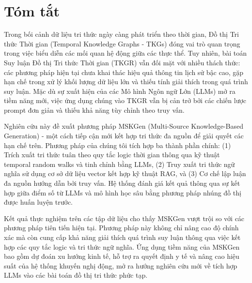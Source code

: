\chapter*{Tóm tắt}
\label{summary}

Trong bối cảnh dữ liệu tri thức ngày càng phát triển theo thời gian, Đồ thị Tri thức Thời gian (Temporal Knowledge Graphs - TKGs) đóng vai trò quan trọng trong việc biểu diễn các mối quan hệ động giữa các thực thể. Tuy nhiên, bài toán Suy luận Đồ thị Tri thức Thời gian (TKGR) vẫn đối mặt với nhiều thách thức: các phương pháp hiện tại chưa khai thác hiệu quả thông tin lịch sử bậc cao, gặp hạn chế trong xử lý khối lượng dữ liệu lớn và thiếu tính giải thích trong quá trình suy luận. Mặc dù sự xuất hiện của các Mô hình Ngôn ngữ Lớn (LLMs) mở ra tiềm năng mới, việc ứng dụng chúng vào TKGR vẫn bị cản trở bởi các chiến lược prompt đơn giản và thiếu khả năng tùy chỉnh theo truy vấn.

Nghiên cứu này đề xuất phương pháp MSKGen (Multi-Source Knowledge-Based Generation) - một cách tiếp cận mới kết hợp tri thức đa nguồn để giải quyết các hạn chế trên. Phương pháp của chúng tôi tích hợp ba thành phần chính: (1) Trích xuất tri thức tuân theo quy tắc logic thời gian thông qua kỹ thuật temporal random walks và tinh chỉnh bằng LLMs, (2) Truy xuất tri thức ngữ nghĩa sử dụng cơ sở dữ liệu vector kết hợp kỹ thuật RAG, và (3) Cơ chế lập luận đa nguồn hướng dẫn bởi truy vấn. Hệ thống đánh giá kết quả thông qua sự kết hợp giữa điểm số từ LLMs và mô hình học sâu bằng phương pháp nhúng đồ thị được huấn luyện trước.

Kết quả thực nghiệm trên các tập dữ liệu cho thấy MSKGen vượt trội so với các phương pháp tiên tiến hiện tại. Phương pháp này không chỉ nâng cao độ chính xác mà còn cung cấp khả năng giải thích quá trình suy luận thông qua việc kết hợp các quy tắc logic và tri thức ngữ nghĩa. Ứng dụng tiềm năng của MSKGen bao gồm dự đoán xu hướng kinh tế, hỗ trợ ra quyết định y tế và nâng cao hiệu suất của hệ thống khuyến nghị động, mở ra hướng nghiên cứu mới về tích hợp LLMs vào các bài toán đồ thị tri thức phức tạp.

